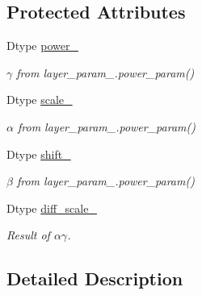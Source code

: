 \subsection*{Protected Attributes}
\begin{DoxyCompactItemize}
\item 
Dtype \hyperlink{classcaffe_1_1PowerLayer_a882ce133988e4dd72a10d87fec4c04c3}{power\+\_\+}\hypertarget{classcaffe_1_1PowerLayer_a882ce133988e4dd72a10d87fec4c04c3}{}\label{classcaffe_1_1PowerLayer_a882ce133988e4dd72a10d87fec4c04c3}

\begin{DoxyCompactList}\small\item\em $ \gamma $ from layer\+\_\+param\+\_\+.\+power\+\_\+param() \end{DoxyCompactList}\item 
Dtype \hyperlink{classcaffe_1_1PowerLayer_a6684b2c6c2b2047d58c9d2809b86c39c}{scale\+\_\+}\hypertarget{classcaffe_1_1PowerLayer_a6684b2c6c2b2047d58c9d2809b86c39c}{}\label{classcaffe_1_1PowerLayer_a6684b2c6c2b2047d58c9d2809b86c39c}

\begin{DoxyCompactList}\small\item\em $ \alpha $ from layer\+\_\+param\+\_\+.\+power\+\_\+param() \end{DoxyCompactList}\item 
Dtype \hyperlink{classcaffe_1_1PowerLayer_a3a3143c4d6735d12cb5a41b1cb623bc9}{shift\+\_\+}\hypertarget{classcaffe_1_1PowerLayer_a3a3143c4d6735d12cb5a41b1cb623bc9}{}\label{classcaffe_1_1PowerLayer_a3a3143c4d6735d12cb5a41b1cb623bc9}

\begin{DoxyCompactList}\small\item\em $ \beta $ from layer\+\_\+param\+\_\+.\+power\+\_\+param() \end{DoxyCompactList}\item 
Dtype \hyperlink{classcaffe_1_1PowerLayer_aa83169eaa1b573137aa6ed2b526879f0}{diff\+\_\+scale\+\_\+}\hypertarget{classcaffe_1_1PowerLayer_aa83169eaa1b573137aa6ed2b526879f0}{}\label{classcaffe_1_1PowerLayer_aa83169eaa1b573137aa6ed2b526879f0}

\begin{DoxyCompactList}\small\item\em Result of $ \alpha \gamma $. \end{DoxyCompactList}\end{DoxyCompactItemize}


\subsection{Detailed Description}
